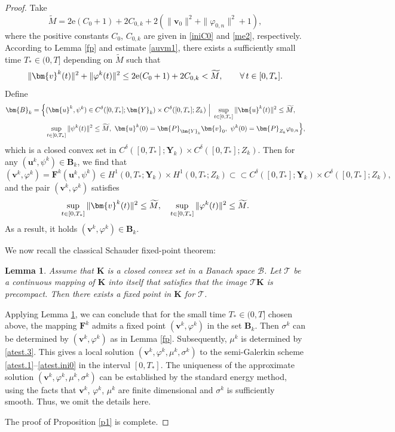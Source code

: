 \documentclass[11pt,reqno]{amsart}
\newtheorem{lemma}{\textbf{Lemma}}[section]
\def\be{\begin{equation}}
\def\ee{\end{equation}}
\def\bl{\begin{lemma}}
\def\el{\end{lemma}}
\def\vv{\bm{v}}
\begin{document}
\begin{proof}
Take
$$
\widetilde{M}= 2\mathrm{e}( C_0+ 1) +2C_{0,k} + 2(\|\bm{v}_0\|^2+  \|\varphi_{0,n}\|^2  +1),
$$
where the positive constants $C_0$, $C_{0,k}$ are given in \eqref{iniC0} and \eqref{me2}, respectively.
According to Lemma \ref{fp} and estimate \eqref{auvm1}, there exists a sufficiently small time $T_*\in (0,T]$ depending on $\widetilde{M}$ such that
%
\begin{equation}
\|\bm{v}^{k}(t)\|^2+ \|\varphi^{k}(t)\|^2
\leq
2 \mathrm{e} ( C_0 + 1 ) + 2 C_{0,k}<\widetilde{M},\qquad \forall\, t\in [0,T_*].
\notag
\end{equation}
%
Define
\be
\begin{aligned}
\bm{B}_k&=\Big\{(\bm{u}^k,\psi^k)\in C^\delta([0,T_*];\bm{Y}_{k}) \times C^\delta([0,T_*];Z_{k})\ \Big|\ \sup_{t\in[0,T_*]}\|\bm{u}^k(t)\|^2\leq \widetilde{M},\\
& \qquad  \sup_{t\in[0,T_*]}\|\psi^k(t)\|^2\leq \widetilde{M},\ \bm{u}^{k}(0)= \bm{P}_{\bm{Y}_{k}} \bm{v}_{0},\ \psi^{k}(0)= \bm{P}_{Z_{k}} \varphi_{0,n}\Big\},
\end{aligned}
\notag
\ee
which is a closed convex set in $C^\delta([0,T_*];\bm{Y}_{k}) \times C^\delta([0,T_*];Z_{k})$. Then for any $(\bm{u}^k,\psi^k)\in \bm{B}_k$, we find that
$$
(\bm{v}^k,\varphi^k)=\mathbf{F}^k(\bm{u}^k,\psi^k)\in H^1(0,T_*;\bm{Y}_{k})\times H^1(0,T_*;Z_{k})\subset\subset C^\delta([0,T_*];\bm{Y}_{k}) \times C^\delta([0,T_*];Z_{k}),
$$
and the pair $(\bm{v}^k,\varphi^k)$ satisfies
%
\begin{align}
\sup_{t\in[0,T_{*}]}\|\bm{v}^k(t)\|^2 \le\widetilde{M},\quad \sup_{t\in[0,T_{*}]}\|\varphi^k(t)\|^2 \le\widetilde{M}.\notag
\end{align}
%
As a result, it holds $(\bm{v}^k,\varphi^k)\in \bm{B}_k$.

We now recall the classical Schauder fixed-point theorem:
%
\bl\label{SH}
Assume that $\bm{K}$ is a closed convex set in a Banach space
$\mathcal{B}$. Let $\mathcal{T}$ be a continuous mapping of $\bm{K}$ into itself that satisfies that the image $\mathcal{T}\bm{K}$ is precompact.
Then there exists a fixed point in $\bm{K}$ for $\mathcal{T}$.
\el
%
Applying Lemma \ref{SH}, we can conclude that for the small time $T_*\in (0,T]$ chosen above, the mapping $\mathbf{F}^k$ admits a fixed point $(\bm{v}^k,\varphi^k)$ in the set $\bm{B}_k$. Then $\sigma^k$ can be determined by $(\bm{v}^k,\varphi^k)$ as in Lemma \ref{fp}. Subsequently, $\mu^k$ is determined by \eqref{atest.3}.
This gives a local solution $(\bm{v}^k,\varphi^k,\mu^k,\sigma^k)$ to the semi-Galerkin scheme \eqref{atest.1}--\eqref{atest.ini0} in the interval $[0,T_*]$. The uniqueness of the approximate solution $(\bm{v}^k,\varphi^k,\mu^k,\sigma^k)$ can be established by the standard energy method, using the facts that $\vv^k$, $\varphi^k$, $\mu^k$ are finite dimensional and $\sigma^k$ is sufficiently smooth. Thus, we omit the details here.

The proof of Proposition \ref{p1} is complete.
\end{proof}
\end{document}
